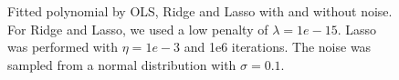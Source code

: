 \begin{figure} [H]
    \caption{Fitted polynomial by OLS, Ridge and Lasso with and without noise. For Ridge and Lasso, we used a low penalty of $\lambda=1e-15$. Lasso was performed with $\eta=1e-3$ and 1e6 iterations. The noise was sampled from a normal distribution with $\sigma=0.1$.}%
    \label{fig:franke_plots}%
\end{figure}

\restoregeometry

